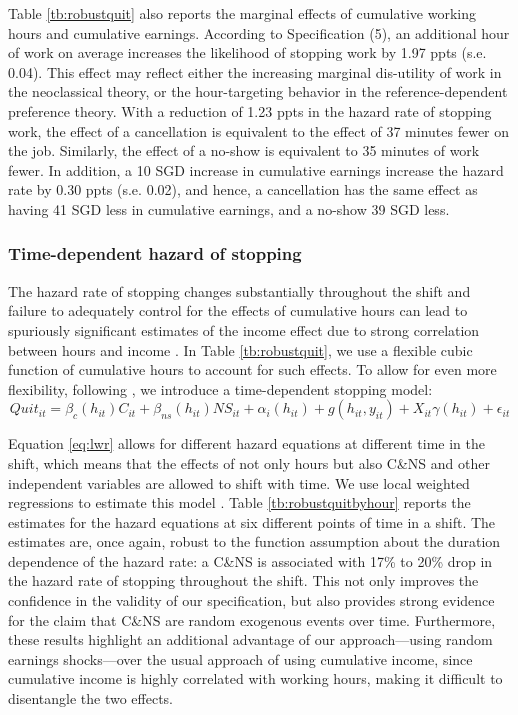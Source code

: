 \documentclass[reviewmode]{restat}
\begin{document}
Table \ref{tb:robustquit} also reports the marginal effects of cumulative working hours and cumulative earnings. According to Specification (5), an additional hour of work on average increases the likelihood of stopping work by 1.97 ppts (s.e. 0.04). This effect may reflect either the increasing marginal dis-utility of work in the neoclassical theory, or the hour-targeting behavior in the reference-dependent preference theory. With a reduction of 1.23 ppts in the hazard rate of stopping work, the effect of a cancellation is equivalent to the effect of 37 minutes fewer on the job. Similarly, the effect of a no-show is equivalent to 35 minutes of work fewer. In addition, a 10 SGD increase in cumulative earnings increase the hazard rate by 0.30 ppts (s.e. 0.02), and hence, a cancellation has the same effect as having 41 SGD less in cumulative earnings, and a no-show 39 SGD less.

\subsubsection{Time-dependent hazard of stopping}
The hazard rate of stopping changes substantially throughout the shift and failure to adequately control for the effects of cumulative hours can lead to spuriously significant estimates of the income effect due to strong correlation between hours and income \citep{thakral2018daily}. In Table \ref{tb:robustquit}, we use a flexible cubic function of cumulative hours to account for such effects. To allow for even more flexibility, following \cite{thakral2018daily}, we introduce a time-dependent stopping model:
\begin{equation}
\label{eq:lwr}
    Quit_{it} = \beta_c(h_{it})C_{it} + \beta_{ns}(h_{it}){NS}_{it} + \alpha_i(h_{it}) + g(h_{it}, y_{it}) + X_{it}\gamma(h_{it}) + \epsilon_{it}
\end{equation}

Equation \eqref{eq:lwr} allows for different hazard equations at different time in the shift, which means that the effects of not only hours but also C\&NS and other independent variables are allowed to shift with time. We use local weighted regressions to estimate this model \citep{cleveland1988locally}. Table \ref{tb:robustquitbyhour} reports the estimates for the hazard equations at six different points of time in a shift. The estimates are, once again, robust to the function assumption about the duration dependence of the hazard rate: a C\&NS is associated with 17\% to 20\% drop in the hazard rate of stopping throughout the shift. This not only improves the confidence in the validity of our specification, but also provides strong evidence for the claim that C\&NS are random exogenous events over time. Furthermore, these results highlight an additional advantage of our approach---using random earnings 
shocks---over the usual approach of using cumulative income, since cumulative income is highly correlated
with working hours, making it difficult to disentangle the two effects.  
\end{document}
